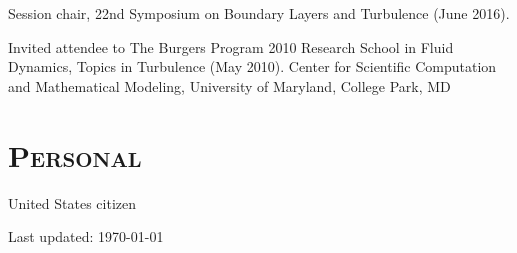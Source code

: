 \documentclass[11pt,letterpaper]{article}
\begin{document}
Session chair, 22nd Symposium on Boundary Layers and Turbulence (June 2016).

Invited attendee to The Burgers Program 2010 Research School in Fluid Dynamics, Topics in Turbulence (May 2010). 
Center for Scientific Computation and Mathematical Modeling, University of Maryland, College Park, MD 

\section*{\textsc{Personal}} 
United States citizen

\bigskip
{\small Last updated: \today}
\end{document}
